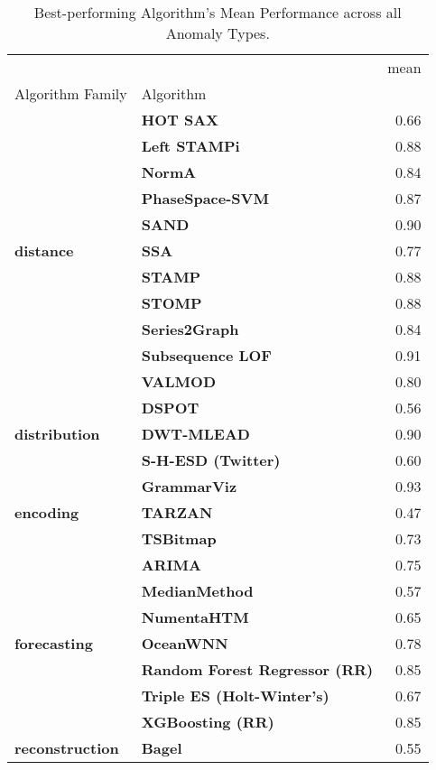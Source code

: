 \begin{table}
\centering
\caption{Best-performing Algorithm's Mean Performance across all Anomaly Types.}
\label{tab:performance_across_anomaly_kinds}
\begin{tabular}{llr}
\toprule
 &  & mean \\
Algorithm Family & Algorithm &  \\
\midrule
\multirow[t]{11}{*}{\textbf{distance}} & \textbf{HOT SAX} & 0.66 \\
\textbf{} & \textbf{Left STAMPi} & 0.88 \\
\textbf{} & \textbf{NormA} & 0.84 \\
\textbf{} & \textbf{PhaseSpace-SVM} & 0.87 \\
\textbf{} & \textbf{SAND} & 0.90 \\
\textbf{} & \textbf{SSA} & 0.77 \\
\textbf{} & \textbf{STAMP} & 0.88 \\
\textbf{} & \textbf{STOMP} & 0.88 \\
\textbf{} & \textbf{Series2Graph} & 0.84 \\
\textbf{} & \textbf{Subsequence LOF} & 0.91 \\
\textbf{} & \textbf{VALMOD} & 0.80 \\
\cline{1-3}
\multirow[t]{3}{*}{\textbf{distribution}} & \textbf{DSPOT} & 0.56 \\
\textbf{} & \textbf{DWT-MLEAD} & 0.90 \\
\textbf{} & \textbf{S-H-ESD (Twitter)} & 0.60 \\
\cline{1-3}
\multirow[t]{3}{*}{\textbf{encoding}} & \textbf{GrammarViz} & 0.93 \\
\textbf{} & \textbf{TARZAN} & 0.47 \\
\textbf{} & \textbf{TSBitmap} & 0.73 \\
\cline{1-3}
\multirow[t]{7}{*}{\textbf{forecasting}} & \textbf{ARIMA} & 0.75 \\
\textbf{} & \textbf{MedianMethod} & 0.57 \\
\textbf{} & \textbf{NumentaHTM} & 0.65 \\
\textbf{} & \textbf{OceanWNN} & 0.78 \\
\textbf{} & \textbf{Random Forest Regressor (RR)} & 0.85 \\
\textbf{} & \textbf{Triple ES (Holt-Winter's)} & 0.67 \\
\textbf{} & \textbf{XGBoosting (RR)} & 0.85 \\
\cline{1-3}
\multirow[t]{7}{*}{\textbf{reconstruction}} & \textbf{Bagel} & 0.55 \\

\end{tabular}
\end{table}
